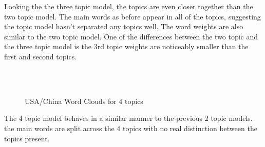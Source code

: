 Looking the the three topic model, the topics are even closer together than the two topic model. The main words as before appear in all of the topics, suggesting the topic model hasn't separated any topics well. The word weights are also similar to the two topic model. One of the differences between the two topic and the three topic model is the 3rd topic weights are noticeably smaller than the first and second topics. 

\begin{figure}[H]
	\centering
	\\
	\\
	
	\caption{USA/China Word Clouds for 4 topics}
	\label{fig:usa4}
\end{figure}

The 4 topic model behaves in a similar manner to the previous 2 topic models. the main words are split across the 4 topics with no real distinction between the topics present. 

